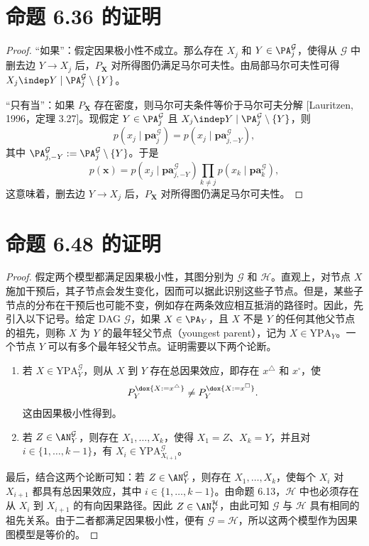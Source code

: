 \section{命题 6.36 的证明}
\begin{proof}
“如果”：假定因果极小性不成立。那么存在 $X_j$ 和 $Y\in\PA_j^{\mathcal G}$，使得从 $\mathcal G$ 中删去边 $Y\to X_j$ 后，$P_{\mathbf X}$ 对所得图仍满足马尔可夫性。由局部马尔可夫性可得 $X_j\indep Y\mid\PA_j^{\mathcal G}\setminus\{Y\}$。

“只有当”：如果 $P_{\mathbf X}$ 存在密度，则马尔可夫条件等价于马尔可夫分解 [Lauritzen, 1996，定理 3.27]。现假定 $Y\in\PA_j^{\mathcal G}$ 且 $X_j\indep Y\mid\PA_j^{\mathcal G}\setminus\{Y\}$，则
\[p(x_j\mid\mathbf{pa}_j^{\mathcal G})=p(x_j\mid\mathbf{pa}_{j,-Y}^{\mathcal G}),\]
其中 $\PA_{j,-Y}^{\mathcal G}:=\PA_j^{\mathcal G}\setminus\{Y\}$。于是
\[p(\mathbf x)=p(x_j\mid\mathbf{pa}_{j,-Y}^{\mathcal G})\prod_{k\ne j}p(x_k\mid\mathbf{pa}_k^{\mathcal G}),\]
这意味着，删去边 $Y\to X_j$ 后，$P_{\mathbf X}$ 对所得图仍满足马尔可夫性。
\end{proof}

\section{命题 6.48 的证明}
\begin{proof}
假定两个模型都满足因果极小性，其图分别为 $\mathcal G$ 和 $\mathcal H$。直观上，对节点 $X$ 施加干预后，其子节点会发生变化，因而可以据此识别这些子节点。但是，某些子节点的分布在干预后也可能不变，例如存在两条效应相互抵消的路径时。因此，先引入以下记号。给定 DAG $\mathcal G$，如果 $X\in\PA_Y$，且 $X$ 不是 $Y$ 的任何其他父节点的祖先，则称 $X$ 为 $Y$ 的最年轻父节点（youngest parent），记为 $X\in\mathrm{YPA}_Y$。一个节点 $Y$ 可以有多个最年轻父节点。证明需要以下两个论断。
\begin{enumerate}[label=(\roman*)]
\item 若 $X\in\mathrm{YPA}_Y^{\mathcal G}$，则从 $X$ 到 $Y$ 存在总因果效应，即存在 $x^\triangle$ 和 $x^\square$，使
\[P_Y^{\dox{X:=x^\triangle}}\ne P_Y^{\dox{X:=x^\square}}.\]
这由因果极小性得到。
\item 若 $Z\in\AN_Y^{\mathcal G}$，则存在 $X_1,\ldots,X_k$，使得 $X_1=Z$、$X_k=Y$，并且对 $i\in\{1,\ldots,k-1\}$，有 $X_i\in\mathrm{YPA}_{X_{i+1}}^{\mathcal G}$。
\end{enumerate}
最后，结合这两个论断可知：若 $Z\in\AN_Y^{\mathcal G}$，则存在 $X_1,\ldots,X_k$，使每个 $X_i$ 对 $X_{i+1}$ 都具有总因果效应，其中 $i\in\{1,\ldots,k-1\}$。由命题 6.13，$\mathcal H$ 中也必须存在从 $X_i$ 到 $X_{i+1}$ 的有向因果路径。因此 $Z\in\AN_Y^{\mathcal H}$，由此可知 $\mathcal G$ 与 $\mathcal H$ 具有相同的祖先关系。由于二者都满足因果极小性，便有 $\mathcal G=\mathcal H$，所以这两个模型作为因果图模型是等价的。
\end{proof}

